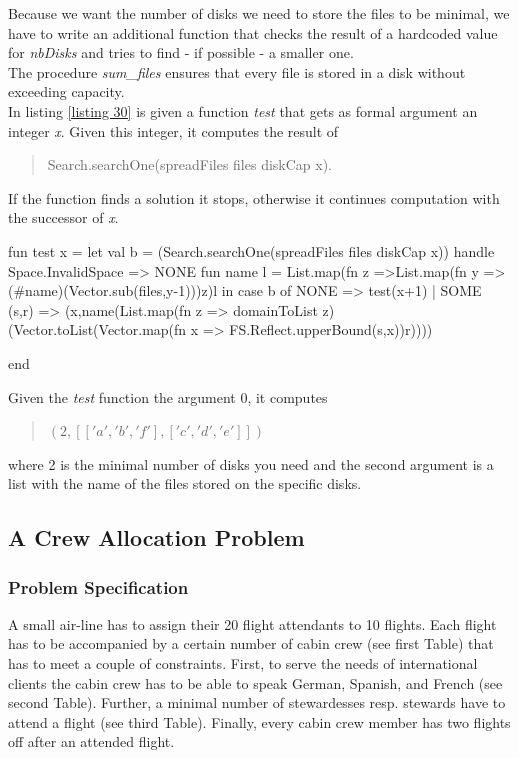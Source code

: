 \documentclass[a4paper]{scrartcl}
\begin{document}
Because we want the number of disks we need to store the files
to be minimal, we have to write an additional function that checks
the result of a hardcoded value for {\it nbDisks} and tries to find -
if possible - a smaller one.\\

The procedure {\it sum\_files} ensures that every file is stored in
a disk without exceeding capacity.\\

In listing \ref{listing 30} is given a function {\it test} that
gets as formal argument an integer {\it x}. Given this integer, it
computes the result of
\begin{quote}
Search.searchOne(spreadFiles files diskCap x).
\end{quote}
If the function finds a solution it stops, otherwise it continues
computation with the successor of {\it x}.
\begin{myverbatim}
fun test x =                        
  let 
     val b = (Search.searchOne(spreadFiles files diskCap x))
             handle Space.InvalidSpace => NONE
     fun name l = List.map(fn z =>List.map(fn y => 
                  (#name)(Vector.sub(files,y-1)))z)l
  in
     case b of NONE => test(x+1)
             | SOME (s,r) =>
               (x,name(List.map(fn z => domainToList z)
                  (Vector.toList(Vector.map(fn x =>
                     FS.Reflect.upperBound(s,x))r))))
     
  end
\end{myverbatim}


Given the {\it test} function the argument 0, it computes
\begin{quote}
$(2, [['a','b','f' ], ['c','d','e' ]])$
\end{quote}
where 2 is the minimal number of disks you need and
the second argument is a list with the name of the files
stored on the specific disks.







\newpage
\subsection{A Crew Allocation Problem}

\subsubsection{Problem Specification}
A small air-line has to assign their 20 flight attendants 
to 10 flights. Each flight has to be accompanied by a certain 
number of cabin crew (see first Table) that has to meet a couple 
of constraints. First, to serve the needs of international 
clients the cabin crew has to be able to speak German, Spanish, 
and French (see second Table). Further, a minimal number of 
stewardesses resp. stewards have to attend a flight 
(see third Table). Finally, every cabin crew member has 
two flights off after an attended flight.\\[1.0cm]
\end{document}
